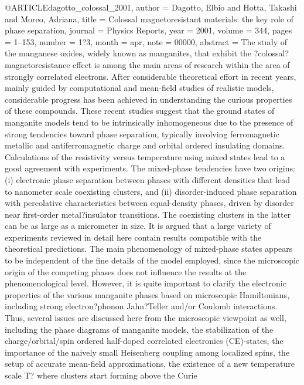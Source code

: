 @ARTICLE{dagotto_colossal_2001,
  author = {Dagotto, Elbio and Hotta, Takashi and Moreo, Adriana},
  title = {Colossal magnetoresistant materials: the key role of phase separation},
  journal = {Physics Reports},
  year = {2001},
  volume = {344},
  pages = {1--153},
  number = {1?3},
  month = apr,
  note = {00000},
  abstract = {The study of the manganese oxides, widely known as manganites, that
	exhibit the ?colossal? magnetoresistance effect is among the main
	areas of research within the area of strongly correlated electrons.
	After considerable theoretical effort in recent years, mainly guided
	by computational and mean-field studies of realistic models, considerable
	progress has been achieved in understanding the curious properties
	of these compounds. These recent studies suggest that the ground
	states of manganite models tend to be intrinsically inhomogeneous
	due to the presence of strong tendencies toward phase separation,
	typically involving ferromagnetic metallic and antiferromagnetic
	charge and orbital ordered insulating domains. Calculations of the
	resistivity versus temperature using mixed states lead to a good
	agreement with experiments. The mixed-phase tendencies have two origins:
	(i) electronic phase separation between phases with different densities
	that lead to nanometer scale coexisting clusters, and (ii) disorder-induced
	phase separation with percolative characteristics between equal-density
	phases, driven by disorder near first-order metal?insulator transitions.
	The coexisting clusters in the latter can be as large as a micrometer
	in size. It is argued that a large variety of experiments reviewed
	in detail here contain results compatible with the theoretical predictions.
	The main phenomenology of mixed-phase states appears to be independent
	of the fine details of the model employed, since the microscopic
	origin of the competing phases does not influence the results at
	the phenomenological level. However, it is quite important to clarify
	the electronic properties of the various manganite phases based on
	microscopic Hamiltonians, including strong electron?phonon Jahn?Teller
	and/or Coulomb interactions. Thus, several issues are discussed here
	from the microscopic viewpoint as well, including the phase diagrams
	of manganite models, the stabilization of the charge/orbital/spin
	ordered half-doped correlated electronics (CE)-states, the importance
	of the naively small Heisenberg coupling among localized spins, the
	setup of accurate mean-field approximations, the existence of a new
	temperature scale T? where clusters start forming above the Curie
}}
